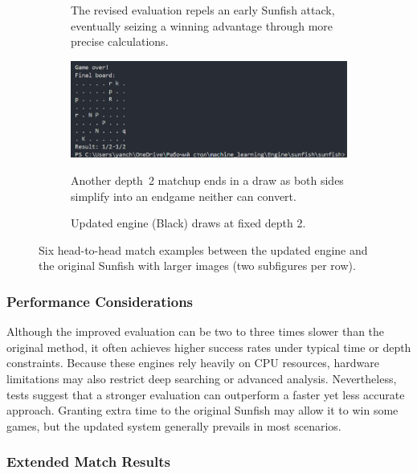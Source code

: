 \documentclass[12pt,a4paper]{article}
\begin{document}
\begin{figure}[htp]
\begin{subfigure}[b]{0.49\textwidth}
        \vspace{0.5em}
        \small
        The revised evaluation repels an early Sunfish
        attack, eventually seizing a winning advantage
        through more precise calculations.
    \end{subfigure}
    \hfill
    \begin{subfigure}[b]{0.49\textwidth}
        \centering
        \includegraphics[width=\textwidth]{figures/yanfishblackdepth2.png}
        \caption{Updated engine (Black) draws at fixed depth 2.}
        \label{fig:screenshot6}
        
        \vspace{0.5em}
        \small
        Another depth~2 matchup ends in a draw as both 
        sides simplify into an endgame neither can convert.
    \end{subfigure}

    \caption{Six head-to-head match examples between the updated engine and the original Sunfish with larger images (two subfigures per row).}
    \label{fig:all_screens_large}
\end{figure}

\subsubsection{Performance Considerations}

Although the improved evaluation can be two to three times slower than the original method, it often achieves higher success rates under typical time or depth constraints. Because these engines rely heavily on CPU resources, hardware limitations may also restrict deep searching or advanced analysis. Nevertheless, tests suggest that a stronger evaluation can outperform a faster yet less accurate approach. Granting extra time to the original Sunfish may allow it to win some games, but the updated system generally prevails in most scenarios.

\subsubsection{Extended Match Results}
\end{document}
